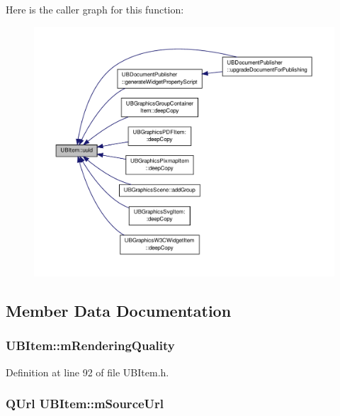 Here is the caller graph for this function\-:
\nopagebreak
\begin{figure}[H]
\begin{center}
\leavevmode
\includegraphics[width=350pt]{d8/d1e/class_u_b_item_a242c8e4390dc3244bd42023b349b042b_icgraph}
\end{center}
\end{figure}




\subsection{Member Data Documentation}
\hypertarget{class_u_b_item_a87b164f64911804513b9167e6d16a9cf}{
\subsubsection[{m\-Rendering\-Quality}]{ U\-B\-Item\-::m\-Rendering\-Quality\hspace{0.3cm}{\ttfamily [protected]}}}\label{d8/d1e/class_u_b_item_a87b164f64911804513b9167e6d16a9cf}


Definition at line 92 of file U\-B\-Item.\-h.

\hypertarget{class_u_b_item_ad90f56dfda5ef98f0d5139bd49840faa}{
\subsubsection[{m\-Source\-Url}]{\setlength{\rightskip}{0pt plus 5cm}Q\-Url U\-B\-Item\-::m\-Source\-Url\hspace{0.3cm}{\ttfamily [protected]}}}\label{d8/d1e/class_u_b_item_ad90f56dfda5ef98f0d5139bd49840faa}


